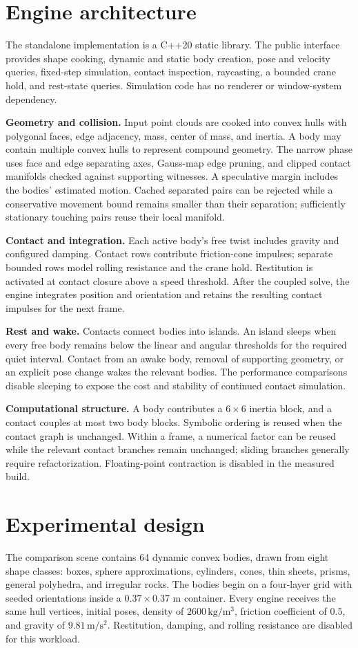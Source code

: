 \documentclass[10pt,letterpaper]{article}
\begin{document}
\newpage
\section{Engine architecture}
The standalone implementation is a C++20 static library. The public interface provides shape cooking, dynamic and static body creation, pose and velocity queries, fixed-step simulation, contact inspection, raycasting, a bounded crane hold, and rest-state queries. Simulation code has no renderer or window-system dependency.

\textbf{Geometry and collision.} Input point clouds are cooked into convex hulls with polygonal faces, edge adjacency, mass, center of mass, and inertia. A body may contain multiple convex hulls to represent compound geometry. The narrow phase uses face and edge separating axes, Gauss-map edge pruning, and clipped contact manifolds checked against supporting witnesses. A speculative margin includes the bodies' estimated motion. Cached separated pairs can be rejected while a conservative movement bound remains smaller than their separation; sufficiently stationary touching pairs reuse their local manifold.

\textbf{Contact and integration.} Each active body's free twist includes gravity and configured damping. Contact rows contribute friction-cone impulses; separate bounded rows model rolling resistance and the crane hold. Restitution is activated at contact closure above a speed threshold. After the coupled solve, the engine integrates position and orientation and retains the resulting contact impulses for the next frame.

\textbf{Rest and wake.} Contacts connect bodies into islands. An island sleeps when every free body remains below the linear and angular thresholds for the required quiet interval. Contact from an awake body, removal of supporting geometry, or an explicit pose change wakes the relevant bodies. The performance comparisons disable sleeping to expose the cost and stability of continued contact simulation.

\textbf{Computational structure.} A body contributes a $6\times6$ inertia block, and a contact couples at most two body blocks. Symbolic ordering is reused when the contact graph is unchanged. Within a frame, a numerical factor can be reused while the relevant contact branches remain unchanged; sliding branches generally require refactorization. Floating-point contraction is disabled in the measured build.

\section{Experimental design}
The comparison scene contains 64 dynamic convex bodies, drawn from eight shape classes: boxes, sphere approximations, cylinders, cones, thin sheets, prisms, general polyhedra, and irregular rocks. The bodies begin on a four-layer grid with seeded orientations inside a $0.37\times0.37$ m container. Every engine receives the same hull vertices, initial poses, density of $2600\,\mathrm{kg/m^3}$, friction coefficient of $0.5$, and gravity of $9.81\,\mathrm{m/s^2}$. Restitution, damping, and rolling resistance are disabled for this workload.
\end{document}
